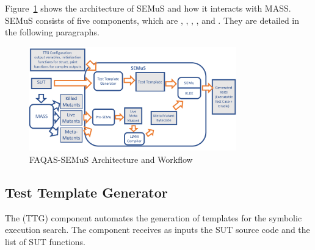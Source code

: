 




Figure~\ref{fig:semus_architecture} shows the architecture of SEMuS and how it interacts with MASS. SEMuS consists of five components, which are ,  ,  ,  , and .
They are detailed in the following paragraphs.

\begin{figure}[h]
\begin{center}
\includegraphics[width=0.8\textwidth]{images/semus-architecture2}
\caption{FAQAS-SEMuS Architecture and Workflow}
\label{fig:semus_architecture}
\end{center}
\end{figure}


\subsection{Test Template Generator}

The  (TTG) component automates the generation of templates for the symbolic execution search. The component receives as inputs the SUT source code and the list of SUT functions. 

